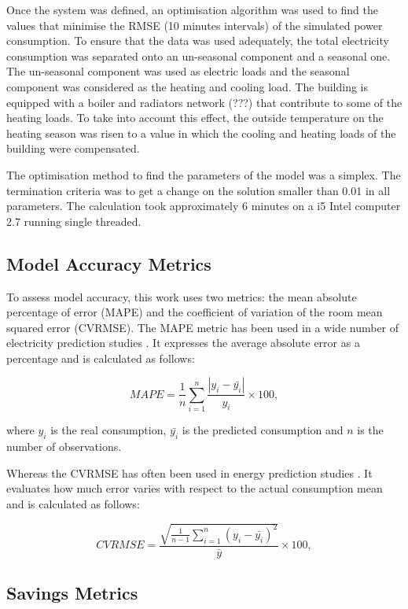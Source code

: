 \documentclass[3p,times,procedia]{elsarticle}
\begin{document}
Once the system was defined, an optimisation algorithm was used to find the values that minimise the RMSE (10 minutes intervals) of the simulated power consumption. To ensure that the data was used adequately, the total electricity consumption was separated onto an un-seasonal component and a seasonal one. The un-seasonal component was used as electric loads and the seasonal component was considered as the heating and cooling load. The building is equipped with a boiler and radiators network (???) that contribute to some of the heating loads. To take into account this effect, the outside temperature on the heating season was risen to a value in which the cooling and heating loads of the building were compensated.

The optimisation method to find the parameters of the model was a simplex. The termination criteria was to get a change on the solution smaller than 0.01 in all parameters. The calculation took approximately 6 minutes on a i5 Intel computer 2.7 running single threaded.





\subsection{Model Accuracy Metrics}

To assess model accuracy, this work uses two metrics: the mean absolute percentage of error (MAPE) and the coefficient of variation of the room mean squared error (CVRMSE).
The MAPE metric has been used in a wide number of electricity prediction studies \cite{fan2014development, edwards2012predicting}
. It expresses the average absolute error as a percentage and is calculated as follows:

\[
 MAPE = \frac{1}{n}\sum_{i=1}^{n} \frac{|y_i-\bar{y_i}|}{y_i}\times 100,
\]

where $y_i$ is the real consumption, $\bar{y_i}$ is the predicted consumption and $n$ is the number of observations.

Whereas the CVRMSE has often been used in energy prediction studies \citep{quilumba2015using} %
. It evaluates how much error varies with respect
to the actual consumption mean and is calculated as follows:

\[
 CVRMSE = \frac{\sqrt{\frac{1}{n-1}\sum_{i=1}^{n}(y_i-\bar{y_i})^2}}{\bar{y}} \times 100,
\]


\subsection{Savings Metrics}
\end{document}
